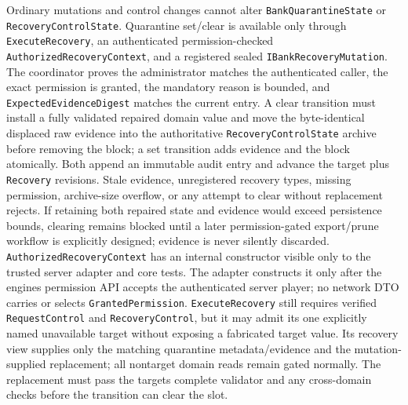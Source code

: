 \documentclass[
  10pt,
  letterpaper,
]{article}
\newcommand{\passthrough}[1]{#1}
\begin{document}
Ordinary mutations and control changes cannot alter
\passthrough{\lstinline!BankQuarantineState!} or
\passthrough{\lstinline!RecoveryControlState!}. Quarantine set/clear is
available only through \passthrough{\lstinline!ExecuteRecovery!}, an
authenticated permission-checked \texttt{AuthorizedRecoveryContext}, and
a registered sealed \passthrough{\lstinline!IBankRecoveryMutation!}. The
coordinator proves the administrator matches the authenticated caller,
the exact permission is granted, the mandatory reason is bounded, and
\passthrough{\lstinline!ExpectedEvidenceDigest!} matches the current
entry. A clear transition must install a fully validated repaired domain
value and move the byte-identical displaced raw evidence into the
authoritative \passthrough{\lstinline!RecoveryControlState!} archive
before removing the block; a set transition adds evidence and the block
atomically. Both append an immutable audit entry and advance the target
plus \passthrough{\lstinline!Recovery!} revisions. Stale evidence,
unregistered recovery types, missing permission, archive-size overflow,
or any attempt to clear without replacement rejects. If retaining both
repaired state and evidence would exceed persistence bounds, clearing
remains blocked until a later permission-gated export/prune workflow is
explicitly designed; evidence is never silently discarded.
\texttt{AuthorizedRecoveryContext} has an internal constructor visible
only to the trusted server adapter and core tests. The adapter
constructs it only after the engine\textquotesingle s permission API
accepts the authenticated server player; no network DTO carries or
selects \passthrough{\lstinline!GrantedPermission!}.
\passthrough{\lstinline!ExecuteRecovery!} still requires verified
\passthrough{\lstinline!RequestControl!} and
\passthrough{\lstinline!RecoveryControl!}, but it may admit its one
explicitly named unavailable target without exposing a fabricated target
value. Its recovery view supplies only the matching quarantine
metadata/evidence and the mutation-supplied replacement; all nontarget
domain reads remain gated normally. The replacement must pass the
target\textquotesingle s complete validator and any cross-domain checks
before the transition can clear the slot.
\end{document}
